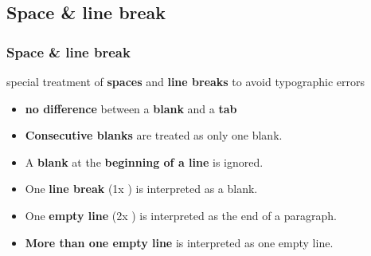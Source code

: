 %
%
%
%
%
%
%
%
%
%
%
%


\subsection{Space \& line break}

\begin{frame}
\frametitle{Space \& line break}

special treatment of \textbf{spaces} and \textbf{line breaks} to avoid typographic errors

\begin{itemize}

\item \textbf{no difference} between a \textbf{blank} and a \textbf{tab}

\item \textbf{Consecutive blanks} are treated as only one blank.

\item A \textbf{blank} at the \textbf{beginning of a line} is ignored.

\item One \textbf{line break} (1x ) is interpreted as a blank.

\item One \textbf{empty line} (2x ) is interpreted as the end of a paragraph.

\item \textbf{More than one empty line} is interpreted as one empty line.

\end{itemize}

\end{frame}


